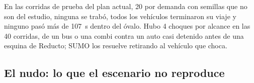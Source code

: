 En las corridas de prueba del plan actual, 20 por demanda con semillas
que no son del estudio, ninguna se trabó, todos los vehículos
terminaron su viaje y ninguno pasó más de 107~s dentro del óvalo. Hubo
4 choques por alcance en las 40 corridas, de un bus o una combi contra
un auto casi detenido antes de una esquina de Reducto; SUMO los
resuelve retirando al vehículo que choca.

\subsection*{El nudo: lo que el escenario no reproduce}

